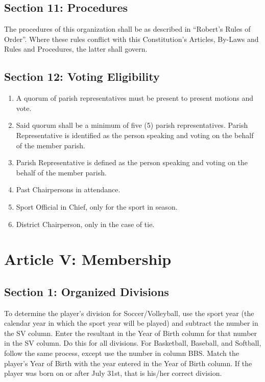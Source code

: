 \subsection{Section 11: Procedures}
\label{ssec:const-4-11}
The procedures of this organization shall be as described in ``Robert's Rules of Order''.  Where these rules conflict with this Constitution’s Articles, By-Laws and Rules and Procedures, the latter shall govern.
    
\subsection{Section 12: Voting Eligibility}
\label{ssec:const-4-12}
\begin{enumerate}[1.]
    \item A quorum of parish representatives must be present to present motions and vote.
    \item Said quorum shall be a minimum of five (5) parish representatives. Parish Representative is identified as the person speaking and voting on the behalf of the member parish.
    \item Parish Representative is defined as the person speaking and voting on the behalf of the member parish.
    \item Past Chairpersons in attendance.
    \item Sport Official in Chief, only for the sport in season.
    \item District Chairperson, only in the case of tie.
\end{enumerate}

\section{Article V: Membership}
\label{sec:const-5}
\subsection{Section 1: Organized Divisions}
\label{ssec:const-5-1}
To determine the player's division for Soccer/Volleyball, use the sport year (the calendar year in which the sport year will be played) and subtract the number in the SV column.  Enter the resultant in the Year of Birth column for that number in the SV column.   Do this for all divisions.  For Basketball, Baseball, and Softball, follow the same process, except use the number in column BBS.  Match the player's Year of Birth with the year entered in the Year of Birth column.  If the player was born on or after July 31st, that is his/her correct division.


